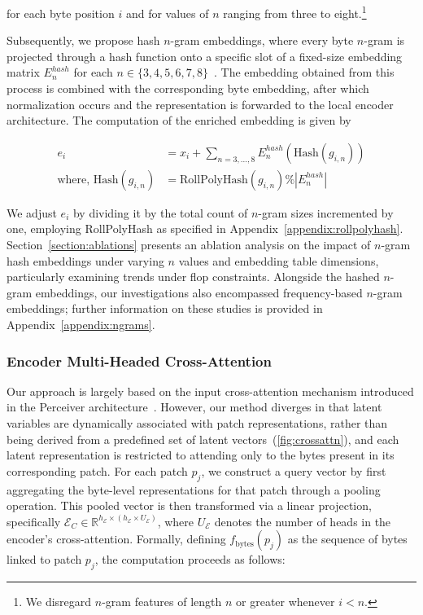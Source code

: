 for each byte position $i$ and for values of $n$ ranging from three to eight.\footnote{
We disregard $n$-gram features of length $n$ or greater whenever $i<n$. }

Subsequently, we propose hash $n$-gram embeddings, where every byte $n$-gram is projected through a hash function onto a specific slot of a fixed-size embedding matrix $E_{n}^{hash}$ for each $n \in\{3,4,5,6,7,8\}$~\citep{bai2010learning}. The embedding obtained from this process is combined with the corresponding byte embedding, after which normalization occurs and the representation is forwarded to the local encoder architecture. The computation of the enriched embedding is given by

\begin{align}
e_i &= x_i + \sum_{n = 3,...,8}E_{n}^{hash}(\text{Hash}(g_{i,n})) \\
\text{where, Hash}(g_{i,n}) &= \text{RollPolyHash}(g_{i,n}) \% |E_{n}^{hash}|
\end{align}

We adjust $e_i$ by dividing it by the total count of $n$-gram sizes incremented by one, employing RollPolyHash as specified in Appendix~\ref{appendix:rollpolyhash}. Section~\ref{section:ablations} presents an ablation analysis on the impact of $n$-gram hash embeddings under varying $n$ values and embedding table dimensions, particularly examining trends under flop constraints. Alongside the hashed $n$-gram embeddings, our investigations also encompassed frequency-based $n$-gram embeddings; further information on these studies is provided in Appendix~\ref{appendix:ngrams}.

\subsubsection{Encoder Multi-Headed Cross-Attention}
\label{sec:enc-cross-attn}
Our approach is largely based on the input cross-attention mechanism introduced in the Perceiver architecture~\citep{jaegle2021perceiver}. However, our method diverges in that latent variables are dynamically associated with patch representations, rather than being derived from a predefined set of latent vectors~(\autoref{fig:crossattn}), and each latent representation is restricted to attending only to the bytes present in its corresponding patch. For each patch $p_j$, we construct a query vector by first aggregating the byte-level representations for that patch through a pooling operation. This pooled vector is then transformed via a linear projection, specifically $\mathcal{E}_{C} \in \mathbb{R}^{h_{\mathcal{E}} \times (h_{\mathcal{E}} \times U_{\mathcal{E}})}$, where $U_{\mathcal{E}}$ denotes the number of heads in the encoder’s cross-attention. Formally, defining $f_{\text{bytes}}(p_j)$ as the sequence of bytes linked to patch $p_j$, the computation proceeds as follows:

